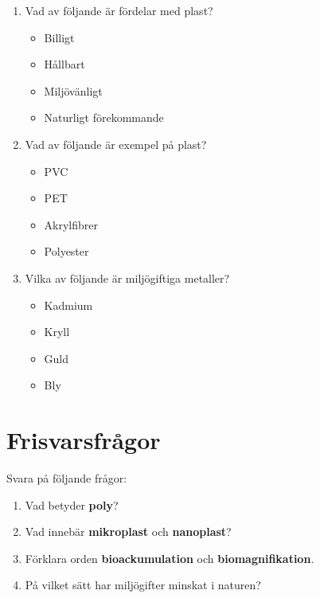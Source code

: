\documentclass{article}
\begin{document}
\begin{enumerate}[label=\arabic*.]
\break

    \item Vad av följande är fördelar med plast?
    \begin{itemize}
        \item Billigt
        \item Hållbart
        \item Miljövänligt
        \item Naturligt förekommande
    \end{itemize}

    \item Vad av följande är exempel på plast?
    \begin{itemize}
        \item PVC
        \item PET
        \item Akrylfibrer
        \item Polyester
    \end{itemize}

    \item Vilka av följande är miljögiftiga metaller?
    \begin{itemize}
        \item Kadmium
        \item Kryll
        \item Guld
        \item Bly
    \end{itemize}
\end{enumerate}

\break

\section*{Frisvarsfrågor}

Svara på följande frågor:

\vspace{5mm} 
\begin{enumerate}[label=\arabic*.]

    \item Vad betyder \textbf{poly}?
    \item Vad innebär \textbf{mikroplast} och \textbf{nanoplast}?
    \item Förklara orden \textbf{bioackumulation} och \textbf{biomagnifikation}.
    \item På vilket sätt har miljögifter minskat i naturen?

\end{enumerate}
\end{document}
